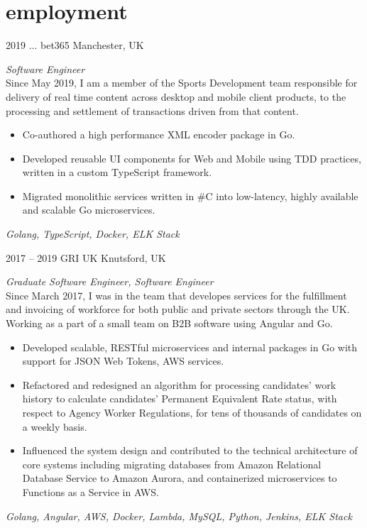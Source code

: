 \documentclass[]{friggeri-cv-a4} %
\begin{document}
\section{employment}
\begin{entrylist}

\entry
{2019 ...}
{bet365}
{Manchester, UK}
{\emph{Software Engineer} \\
Since May 2019, I am a member of the Sports Development team responsible for delivery of real time content across desktop and mobile client products, to the processing and settlement of transactions driven from that content.
\begin{itemize}
\item Co-authored a high performance XML encoder package in Go.
\item Developed reusable UI components for Web and Mobile using TDD practices, written in a custom TypeScript framework.
\item Migrated monolithic services written in \#C into low-latency, highly available and scalable Go microservices.
\end{itemize}
\small{\textit{Golang, TypeScript, Docker, ELK Stack}}
}

\entry
{2017 -- 2019}
{GRI UK}
{Knutsford, UK}
{\emph{Graduate Software Engineer, Software Engineer} \\
Since March 2017, I was in the team that developes services for the fulfillment and invoicing of workforce for both public and private sectors through the UK. Working as a part of
a small team on B2B software using Angular and Go.
\begin{itemize}
\item Developed scalable, RESTful microservices and internal packages in Go with support for JSON Web Tokens, AWS services.
\item Refactored and redesigned an algorithm for processing candidates' work history to calculate candidates' Permanent Equivalent Rate status, with respect to Agency Worker Regulations, for tens of thousands of
candidates on a weekly basis.
\item Influenced the system design and contributed to the technical architecture of core systems including migrating databases from Amazon Relational Database Service to Amazon Aurora, and containerized microservices to Functions as a Service in AWS.
\end{itemize}
\small{\textit{Golang, Angular, AWS, Docker, Lambda, MySQL, Python, Jenkins, ELK Stack}}
}

\end{entrylist}
\end{document}
